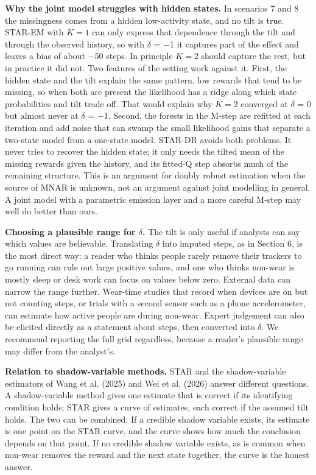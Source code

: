 \documentclass[12pt]{article}
\begin{document}
\textbf{Why the joint model struggles with hidden states.} In scenarios 7 and 8 the missingness comes from a hidden low-activity state, and no tilt is true. STAR-EM with $K=1$ can only express that dependence through the tilt and through the observed history, so with $\delta$ = $-$1 it captures part of the effect and leaves a bias of about $-$50 steps. In principle $K=2$ should capture the rest, but in practice it did not. Two features of the setting work against it. First, the hidden state and the tilt explain the same pattern, low rewards that tend to be missing, so when both are present the likelihood has a ridge along which state probabilities and tilt trade off. That would explain why $K=2$ converged at $\delta$ = 0 but almost never at $\delta$ = $-$1. Second, the forests in the M-step are refitted at each iteration and add noise that can swamp the small likelihood gains that separate a two-state model from a one-state model. STAR-DR avoids both problems. It never tries to recover the hidden state; it only needs the tilted mean of the missing rewards given the history, and its fitted-Q step absorbs much of the remaining structure. This is an argument for doubly robust estimation when the source of MNAR is unknown, not an argument against joint modelling in general. A joint model with a parametric emission layer and a more careful M-step may well do better than ours.

\textbf{Choosing a plausible range for $\delta$.} The tilt is only useful if analysts can say which values are believable. Translating $\delta$ into imputed steps, as in Section 6, is the most direct way: a reader who thinks people rarely remove their trackers to go running can rule out large positive values, and one who thinks non-wear is mostly sleep or desk work can focus on values below zero. External data can narrow the range further. Wear-time studies that record when devices are on but not counting steps, or trials with a second sensor such as a phone accelerometer, can estimate how active people are during non-wear. Expert judgement can also be elicited directly as a statement about steps, then converted into $\delta$. We recommend reporting the full grid regardless, because a reader's plausible range may differ from the analyst's.

\textbf{Relation to shadow-variable methods.} STAR and the shadow-variable estimators of Wang et al. (2025) and Wei et al. (2026) answer different questions. A shadow-variable method gives one estimate that is correct if its identifying condition holds; STAR gives a curve of estimates, each correct if the assumed tilt holds. The two can be combined. If a credible shadow variable exists, its estimate is one point on the STAR curve, and the curve shows how much the conclusion depends on that point. If no credible shadow variable exists, as is common when non-wear removes the reward and the next state together, the curve is the honest answer.
\end{document}
